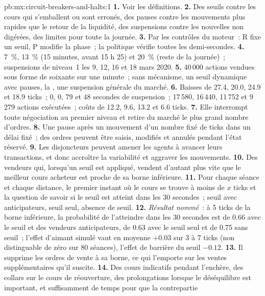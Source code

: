 \begin{solution}{pb:mx:circuit-breakers-and-halts:1}
\textbf{1.} Voir les définitions.
\textbf{2.} Des seuils contre les cours qui s'emballent ou sont erronés, des pauses contre les mouvements plus rapides que le retour de la liquidité, des suspensions contre les nouvelles non digérées, des limites pour toute la journée.
\textbf{3.} Par les contrôles du moteur~: R fixe un seuil, P modifie la phase~; la politique vérifie toutes les demi-secondes.
\textbf{4.} 7~\%, 13~\% (15 minutes, avant 15 h 25) et 20~\% (reste de la journée)~; suspensions de niveau~1 les 9, 12, 16 et 18 mars 2020.
\textbf{5.} 40\,000 actions vendues sous forme de soixante  sur une minute~; sans mécanisme, un seuil dynamique avec pauses, la , une suspension générale du marché.
\textbf{6.} Baisses de 27.4, 20.0, 24.9 et 18.9 ticks~; 0, 0, 79 et 48 secondes de suspension~; 17\,580, 16\,440, 11\,752 et 9\,279 actions exécutées~; coûts de 12.2, 9.6,
13.2 et 6.6 ticks.
\textbf{7.} Elle interrompt toute négociation au premier niveau et retire du marché le plus grand nombre d'ordres.
\textbf{8.} Une pause après un mouvement d'un nombre fixé de ticks dans un délai fixé~; des ordres peuvent être saisis, modifiés et annulés pendant l'état réservé.
\textbf{9.} Les disjoncteurs peuvent amener les agents à avancer leurs transactions, et donc accroître la variabilité et aggraver les mouvements.
\textbf{10.} Des vendeurs qui, lorsqu'un seuil est appliqué, vendent d'autant plus vite que le meilleur cours acheteur est proche de sa borne inférieure.
\textbf{11.} Pour chaque séance et chaque distance, le premier instant où le cours se trouve à moins de $x$ ticks et la question de savoir si le seuil est atteint dans les 30 secondes~; seuil avec anticipateurs,
seuil seul, absence de seuil.
\textbf{12.} \emph{Résultat nommé}~: à 5 ticks de la borne inférieure, la probabilité de l'atteindre dans les 30 secondes est de 0.66 avec le seuil et
des vendeurs anticipateurs, de 0.63 avec le seuil seul et de 0.75 sans seuil~; l'effet d'aimant simulé vaut en moyenne $+0.03$ sur 3 à 7 ticks (non
distinguable de zéro sur 80 séances), l'effet de barrière du seuil $-0.12$.
\textbf{13.} Il supprime les ordres de vente à sa borne, ce qui l'emporte sur les ventes supplémentaires qu'il suscite.
\textbf{14.} Des cours indicatifs pendant l'enchère, des collars sur le cours de réouverture, des prolongations lorsque le déséquilibre est important, et suffisamment de temps pour que la contrepartie

\end{solution}
